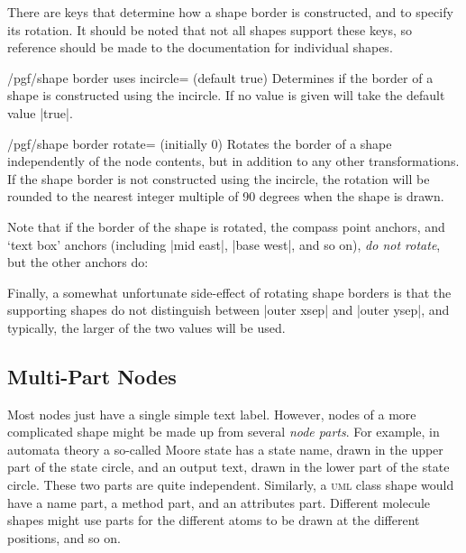 There are \pgfname{} keys that determine how a shape border is constructed, and
to specify its rotation. It should be noted that not all shapes support these
keys, so reference should be made to the documentation for individual shapes.

\begin{key}{/pgf/shape border uses incircle= (default true)}
    Determines if the border of a shape is constructed using the incircle. If
    no value is given  will take the default value |true|.
\end{key}

\begin{key}{/pgf/shape border rotate= (initially 0)}
    Rotates the border of a shape independently of the node contents, but in
    addition to any other transformations. If the shape border is not
    constructed using the incircle, the rotation will be rounded to the nearest
    integer multiple of 90 degrees when the shape is drawn.
\end{key}

Note that if the border of the shape is rotated, the compass point anchors, and
`text box' anchors (including |mid east|, |base west|, and so on), \emph{do not
rotate}, but the other anchors do:
%
\begin{codeexample}[preamble={\usetikzlibrary{shapes.geometric}}]
\end{codeexample}

Finally, a somewhat unfortunate side-effect of rotating shape borders is that
the supporting shapes do not distinguish between |outer xsep| and |outer ysep|,
and typically, the larger of the two values will be used.


\subsection{Multi-Part Nodes}
\label{section-nodes-multi}

Most nodes just have a single simple text label. However, nodes of a more
complicated shape might be made up from several \emph{node parts}. For example,
in automata theory a so-called Moore state has a state name, drawn in the upper
part of the state circle, and an output text, drawn in the lower part of the
state circle. These two parts are quite independent. Similarly, a \textsc{uml}
class shape would have a name part, a method part, and an attributes part.
Different molecule shapes might use parts for the different atoms to be drawn
at the different positions, and so on.

